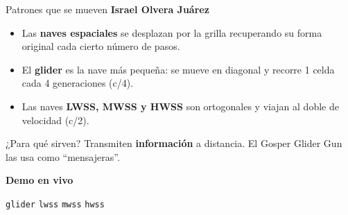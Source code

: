 \documentclass[10pt,aspectratio=169]{beamer}
\newcommand{\demo}[1]{\textcolor{democolor}{\texttt{#1}}}
\begin{document}
\begin{frame}{Patrones que se mueven}
  \textbf{Israel Olvera Juárez}

  \vspace{0.4cm}

  \begin{itemize}
    \item Las \textbf{naves espaciales} se desplazan por la grilla
          recuperando su forma original cada cierto número de pasos.
    \item El \textbf{glider} es la nave más pequeña: se mueve en diagonal
          y recorre 1 celda cada 4 generaciones (c/4).
    \item Las naves \textbf{LWSS, MWSS y HWSS} son ortogonales y viajan
          al doble de velocidad (c/2).
  \end{itemize}

  \begin{block}{¿Para qué sirven?}
    Transmiten \textbf{información} a distancia.
    El Gosper Glider Gun las usa como ``mensajeras''.
  \end{block}

  \vspace{0.3cm}

  \begin{center}
    \textbf{Demo en vivo}

    \demo{glider} \quad \demo{lwss} \quad \demo{mwss} \quad \demo{hwss}
  \end{center}
\end{frame}
\end{document}
